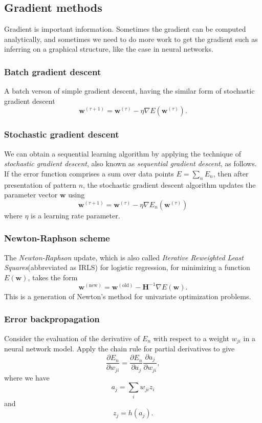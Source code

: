 \documentclass[a4paper]{book}
\renewcommand{\bf}{\mathbf}
\newcommand{\imp}[1]{\textit{#1}}
\begin{document}
\subsection{Gradient methods}
Gradient is important information. Sometimes the gradient can be computed analytically, and sometimes we need to do more work to get the gradient such as inferring on a graphical structure, like the case in neural networks.
\subsubsection{Batch gradient descent}
A batch verson of simple gradient descent, having the similar form of stochastic gradient descent
\begin{equation}
	\bf{w}^{(\tau + 1)} = \bf{w}^{(\tau)} - \eta \nabla E(\bf{w}^{(\tau)}).
\end{equation}
\subsubsection{Stochastic gradient descent}
We can obtain a sequential learning algorithm by applying the technique of \imp{stochastic gradient descent}, also known as \imp{sequential gradient descent}, as follows. If the error function comprises a sum over data points $E=\sum_n E_n$, then after presentation of pattern $n$, the stochastic gradient descent algorithm updates the parameter vector $\bf{w}$ using
\begin{equation}
	\bf{w}^{(\tau + 1)} = \bf{w}^{(\tau)} - \eta \nabla E_n(\bf{w}^{(\tau)})
\end{equation}
where $\eta$ is a learning rate parameter.
\subsubsection{Newton-Raphson scheme}
The \imp{Newton-Raphson} update, which is also called \imp{Iterative Reweighted Least Squares}(abbreviated as IRLS) for logistic regression, for minimizing a function $E(\bf{w})$, takes the form
\begin{equation}
	\bf{w}^{(\text{new})} = \bf{w}^{(\text{old})} - \bf{H}^{-1} \nabla E(\bf{w}).
\end{equation}
This is a generation of Newton's method for univariate optimization problems.
\subsubsection{Error backpropagation}
Consider the evaluation of the derivative of $E_n$ with respect to a weight $w_{ji}$ in a neural network model. Apply the chain rule for partial derivatives to give
\begin{equation}
	\frac{\partial E_n}{\partial w_{ji}} = \frac{\partial E_n}{\partial a_j}\frac{\partial a_j}{\partial w_{ji}},
\end{equation}
where we have
\begin{equation}
	a_j = \sum_i w_{ji}z_i\label{prop1}
\end{equation}
and
\begin{equation}
	z_j = h(a_j).\label{prop2}
\end{equation}
\end{document}
